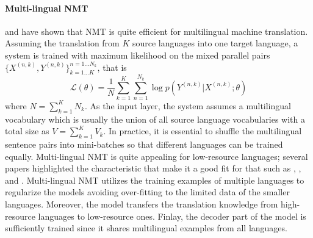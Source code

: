\paragraph{Multi-lingual NMT} and  have shown that NMT is quite efficient for  multilingual machine translation. Assuming the translation from $K$ source languages into one target language, a  system is trained with maximum likelihood on the mixed parallel pairs $\{X^{(n, k)}, Y^{(n, k)}\}_{k=1 ... K}^{n=1 ... N_k}$, that is
\begin{equation}
	\mathcal{L}\left(\theta\right)=\frac{1}{N}\sum_{k=1}^{K}\sum_{n=1}^{N_k}\log p\left(Y^{(n, k)}|X^{(n, k)}; \theta\right)
\end{equation}
where $N=\sum_{k=1}^K N_k$. As the input layer, the system assumes a multilingual vocabulary which is usually the union of all  source language vocabularies with a total size as $V=\sum_{k=1}^K V_k$. In practice, it is essential to shuffle the multilingual sentence pairs into mini-batches so that different languages can be trained equally.
Multi-lingual NMT is quite appealing for low-resource languages; several papers highlighted  the characteristic that make it a good fit for that  such as  , ,  and . Multi-lingual NMT utilizes the training examples of multiple languages to regularize the models  avoiding over-fitting to the limited data of the smaller languages. Moreover, the model transfers the translation knowledge from high-resource languages to low-resource ones. Finlay, the decoder part of the model is sufficiently trained  since it shares  multilingual examples from all languages.

